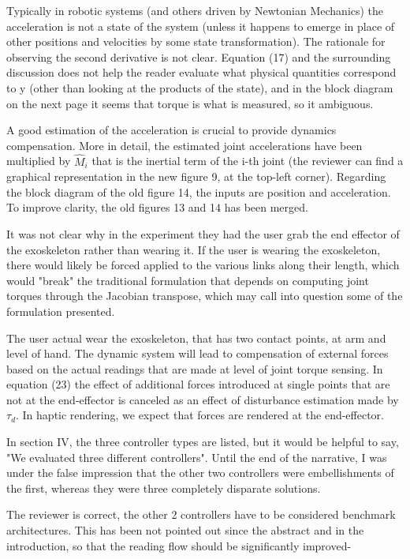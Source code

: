 \begin{point}
	
	Typically in robotic systems (and others driven by Newtonian Mechanics)
	the acceleration is not a state of the system (unless it happens to
	emerge in place of other positions and velocities by some state
	transformation). The rationale for observing the second derivative is
	not clear. Equation (17) and the surrounding discussion does not help
	the reader evaluate what physical quantities correspond to y (other
	than looking at the products of the state), and in the block diagram on
	the next page it seems that torque is what is measured, so it
	ambiguous.
	
\end{point}
\begin{reply}
A good estimation of the acceleration is crucial to provide dynamics compensation.
More in detail, the estimated joint accelerations have been multiplied by $\hat{M}_i$ that is the inertial term of the i-th joint (the reviewer can find a graphical representation in the new figure 9, at the top-left corner). 
Regarding the block diagram of the old figure 14, the inputs are position and acceleration. To improve clarity, the old figures 13 and 14 has been merged.
\end{reply}




\begin{point}
	It was not clear why in the experiment they had the user
	grab the end effector of the exoskeleton rather than wearing it. If the
	user is wearing the exoskeleton, there would likely be forced applied
	to the various links along their length, which would "break" the
	traditional formulation that depends on computing joint torques through
	the Jacobian transpose, which may call into question some of the
	formulation presented.
\end{point}
\begin{reply}
The user actual wear the exoskeleton, that has two contact points, at arm and level of hand. The dynamic system will lead to compensation of external forces based on the actual readings that are made at level of joint torque sensing.  In equation (23) the effect of additional forces introduced at single points that are not at the end-effector is canceled as an effect of disturbance estimation made by $\tau_{d}$.
In haptic rendering, we expect that forces are rendered at the end-effector.
\end{reply}


\begin{point}
	In section IV, the three controller types are listed, but it would be
	helpful to say, "We evaluated three different controllers". Until the
	end of the narrative, I was under the false impression that the other
	two controllers were embellishments of the first, whereas they were
	three completely disparate solutions.
\end{point}
\begin{reply}
The reviewer is correct, the other 2 controllers have to be considered benchmark architectures. This has been not pointed out since the abstract and in the introduction, so that the reading flow should be significantly improved-
\end{reply}


